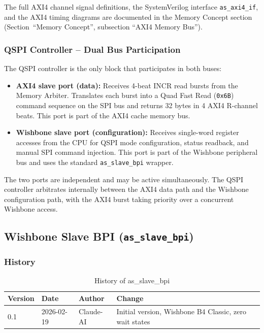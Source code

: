 The full AXI4 channel signal definitions, the SystemVerilog interface
\texttt{as\_axi4\_if}, and the AXI4 timing diagrams are documented in
the Memory Concept section (Section~``Memory Concept'',
subsection ``AXI4 Memory Bus'').

\subsubsection{QSPI Controller -- Dual Bus Participation}

The QSPI controller is the only block that participates in both buses:

\begin{itemize}
  \item \textbf{AXI4 slave port (data):}
    Receives 4-beat INCR read bursts from the Memory Arbiter.
    Translates each burst into a Quad Fast Read (\texttt{0x6B})
    command sequence on the SPI bus and returns 32 bytes in 4 AXI4
    R-channel beats.
    This port is part of the AXI4 cache memory bus.

  \item \textbf{Wishbone slave port (configuration):}
    Receives single-word register accesses from the CPU for
    QSPI mode configuration, status readback, and manual SPI command
    injection.
    This port is part of the Wishbone peripheral bus and uses the
    standard \texttt{as\_slave\_bpi} wrapper.
\end{itemize}

The two ports are independent and may be active simultaneously.
The QSPI controller arbitrates internally between the AXI4 data path
and the Wishbone configuration path, with the AXI4 burst taking
priority over a concurrent Wishbone access.

\subsection{Wishbone Slave BPI (\texttt{as\_slave\_bpi})}
\label{subsec:asSlaveBpi}

\subsubsection{History}
\begin{table}[H]
\caption{History of as\_slave\_bpi}
\label{tab:asSlaveBpiHist}
\centering
\begin{tabularx}{\textwidth}{|l |l |l |X|}
  \hline
  Version & Date & Author & Change \\
  \hline
  \hline
  0.1 & 2026-02-19 & Claude-AI & Initial version, Wishbone B4 Classic, zero wait states \\
  \hline
\end{tabularx}
\end{table}

